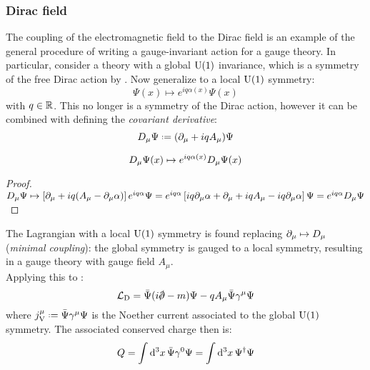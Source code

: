 \subsubsection{Dirac field}

The coupling of the electromagnetic field to the Dirac field is an example of the general procedure of writing a gauge-invariant action for a gauge theory. In particular, consider a theory with a global $ \mathrm{U}(1) $ invariance, which is a symmetry of the free Dirac action by . Now generalize to a local $ \mathrm{U}(1) $ symmetry:
\begin{equation}
  \Psi(x) \mapsto e^{iq \alpha(x)} \Psi(x)
  \label{eq:qed-dir-inv}
\end{equation}
with $ q \in \mathbb{R} $. This no longer is a symmetry of the Dirac action, however it can be combined with  defining the \textit{covariant derivative}:
\begin{equation}
  \covder_\mu \Psi \defeq (\pa_\mu + i q A_\mu) \Psi
\end{equation}

\begin{proposition}[before upper = {\tcbtitle}]{}{}
  \begin{equation}
    D_\mu \Psi(x) \mapsto e^{i q \alpha(x)} D_\mu \Psi(x)
    \label{eq:qed-cov-der}
  \end{equation}
\end{proposition}

\begin{proofbox}
  \begin{proof}
      $ D_\mu \Psi \mapsto \left[ \partial_\mu + i q (A_\mu - \partial_\mu \alpha) \right] e^{i q \alpha} \Psi = e^{i q \alpha} \left[ i q \partial_\mu \alpha + \partial_\mu + i q A_\mu - i q \partial_\mu \alpha \right] \Psi = e^{i q \alpha} D_\mu \Psi $
  \end{proof}
\end{proofbox}

The Lagrangian with a local $ \mathrm{U}(1) $ symmetry is found replacing $ \partial_\mu \mapsto D_\mu $ (\textit{minimal coupling}): the global symmetry is gauged to a local symmetry, resulting in a gauge theory with gauge field $ A_\mu $. \\
Applying this to :
\begin{equation}
  \lag_\text{D} = \bar{\Psi} (i \slashed{\pa} - m) \Psi - q A_\mu \bar{\Psi} \gamma^\mu \Psi
\end{equation}
where $ j_\text{V}^\mu \defeq \bar{\Psi} \gamma^\mu \Psi $ is the Noether current associated to the global $ \mathrm{U}(1) $ symmetry. The associated conserved charge then is:
\begin{equation}
  Q = \int \mathrm{d}^3x\, \bar{\Psi} \gamma^0 \Psi = \int \mathrm{d}^3x\, \Psi^\dagger \Psi
\end{equation}

